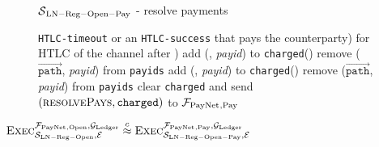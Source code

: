 \begin{figure}[H]
\begin{simulatorbox}{$\mathcal{S}{}_{\mathrm{LN - Reg - Open - Pay}}$ - resolve
  payments}
\begin{algorithmic}[1]
{              \texttt{HTLC-timeout} or an \texttt{HTLC-success} that pays the
              counterparty) for HTLC of the channel after \alice{})}
              \label{alg:sim:resolvepay:negligent}
                \State add (\alice, \textit{payid}) to \texttt{charged}(\alice)
                \State remove ($\overrightarrow{\mathtt{path}}$, \textit{payid})
                from \texttt{payids}
                \State add (\alice, \textit{payid}) to \texttt{charged}(\alice)
                \State remove ($\overrightarrow{\mathtt{path}}$, \textit{payid})
                from \texttt{payids}
              \EndIf
            \EndFor
          \EndFor
          \label{alg:sim:resolvepay:loopend}
        \EndIf
        \State clear \texttt{charged} and send $\left(\textsc{resolvePays},
        \mathtt{charged}\right)$ to $\mathcal{F}_{\mathrm{PayNet}}{}_{\mathrm{, Pay}}$
      \EndIndent
    \end{algorithmic}
  \end{simulatorbox}
  \caption{}
  \label{alg:sim:resolvepay}
\end{figure}

\begin{lemma}
  \label{lemma:pay}
  $\textsc{Exec}^{\mathcal{F}_{\mathrm{PayNet}}{}_{\mathrm{, Open}}, \mathcal{G}_{\mathrm{Ledger}}}_{\mathcal{S}_{\mathrm{LN
  - Reg - Open}}, \mathcal{E}} \overset{c}{\approx}
  \textsc{Exec}^{\mathcal{F}_{\mathrm{PayNet}}{}_{\mathrm{, Pay}}, \mathcal{G}_{\mathrm{Ledger}}}_{\mathcal{S}_{\mathrm{LN -
  Reg - Open - Pay}}, \mathcal{E}}$
\end{lemma}

